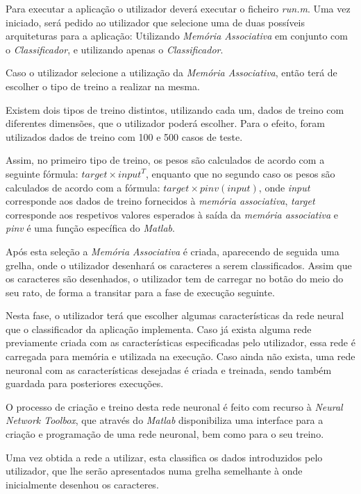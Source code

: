 \documentclass{article}
\begin{document}
Para executar a aplicação o utilizador deverá executar o ficheiro \emph{run.m}. Uma vez iniciado, será pedido ao utilizador que selecione uma de duas possíveis arquiteturas para a aplicação: Utilizando \emph{Memória Associativa} em conjunto com o \emph{Classificador}, e utilizando apenas o \emph{Classificador}.

Caso o utilizador selecione a utilização da \emph{Memória Associativa}, então terá de escolher o tipo de treino a realizar na mesma.

Existem dois tipos de treino distintos, utilizando cada um, dados de treino com diferentes dimensões, que o utilizador poderá escolher. Para o efeito, foram utilizados dados de treino com 100 e 500 casos de teste.

Assim, no primeiro tipo de treino, os pesos são calculados de acordo com a seguinte fórmula: $target\times input^T$, enquanto que no segundo caso os pesos são calculados de acordo com a fórmula: $target\times pinv(input)$, onde \emph{input} corresponde aos dados de treino fornecidos à \emph{memória associativa}, \emph{target} corresponde aos respetivos valores esperados à saída da \emph{memória associativa} e \emph{pinv} é uma função específica do \emph{Matlab}.

Após esta seleção a \emph{Memória Associativa} é criada, aparecendo de seguida uma grelha, onde o utilizador desenhará os caracteres a serem classificados. Assim que os caracteres são desenhados, o utilizador tem de carregar no botão do meio do seu rato, de forma a transitar para a fase de execução seguinte.

Nesta fase, o utilizador terá que escolher algumas características da rede neural que o classificador da aplicação implementa. Caso já exista alguma rede previamente criada com as características especificadas pelo utilizador, essa rede é carregada para memória e utilizada na execução. Caso ainda não exista, uma rede neuronal com as características desejadas é criada e treinada, sendo também guardada para posteriores execuções. 

O processo de criação e treino desta rede neuronal é feito com recurso à \emph{Neural Network Toolbox}, que através do \emph{Matlab} disponibiliza uma interface para a criação e programação de uma rede neuronal, bem como para o seu treino.

Uma vez obtida a rede a utilizar, esta classifica os dados introduzidos pelo utilizador, que lhe serão apresentados numa grelha semelhante à onde inicialmente desenhou os caracteres.
\end{document}
